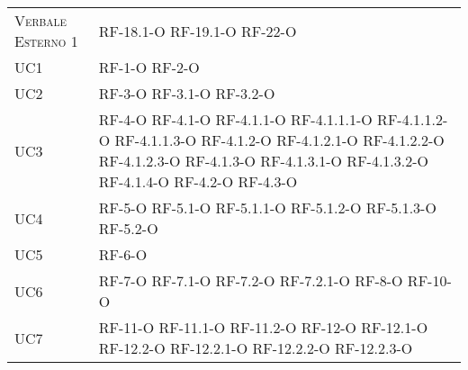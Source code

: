 \begin{longtable}{ 
		>{}p{} 
		>{}p{} }
\textsc{Verbale Esterno 1} &
	RF-18.1-O	\newline
	RF-19.1-O	\newline
	RF-22-O	    \tabularnewline
UC1 &
	RF-1-O	\newline
	RF-2-O	\tabularnewline
UC2 &
	RF-3-O	\newline
	RF-3.1-O	\newline
	RF-3.2-O	\tabularnewline
UC3 &
	RF-4-O			\newline
	RF-4.1-O		\newline
	RF-4.1.1-O		\newline
	RF-4.1.1.1-O	\newline
	RF-4.1.1.2-O	\newline
	RF-4.1.1.3-O	\newline
	RF-4.1.2-O		\newline
	RF-4.1.2.1-O	\newline
	RF-4.1.2.2-O	\newline
	RF-4.1.2.3-O	\newline
	RF-4.1.3-O		\newline
	RF-4.1.3.1-O	\newline
	RF-4.1.3.2-O	\newline
	RF-4.1.4-O		\newline
	RF-4.2-O		\newline
	RF-4.3-O		\tabularnewline
UC4 &
	RF-5-O		\newline
	RF-5.1-O	\newline
	RF-5.1.1-O	\newline
	RF-5.1.2-O	\newline
	RF-5.1.3-O	\newline
	RF-5.2-O	\tabularnewline
UC5 &
	RF-6-O		\tabularnewline
UC6 &
	RF-7-O		\newline
	RF-7.1-O	\newline
	RF-7.2-O	\newline
	RF-7.2.1-O	\newline
	RF-8-O		\newline
	RF-10-O		\tabularnewline
UC7 &
	RF-11-O		\newline
	RF-11.1-O	\newline
	RF-11.2-O	\newline
	RF-12-O		\newline
	RF-12.1-O	\newline
	RF-12.2-O	\newline
	RF-12.2.1-O	\newline
	RF-12.2.2-O	\newline
	RF-12.2.3-O	\newline

\end{longtable}
